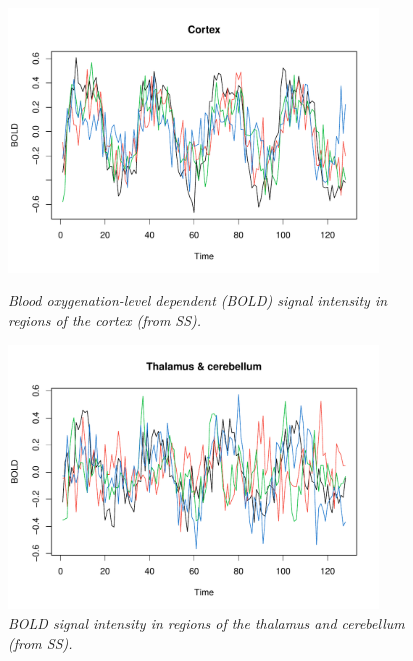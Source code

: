 \documentclass{article}
\begin{document}
\begin{figure}[p]
\centering
\includegraphics[width=0.875\textwidth]{fig/fmri-1.pdf}
\caption{\it Blood oxygenation-level dependent (BOLD) signal intensity in
  regions of the cortex (from SS).}
\label{fig:fmri-cortex}

\medskip
\includegraphics[width=0.875\textwidth]{fig/fmri-2.pdf}
\caption{\it BOLD signal intensity in regions of the thalamus and cerebellum
  (from SS).} 
\label{fig:fmri-tc}
\end{figure}
\end{document}
